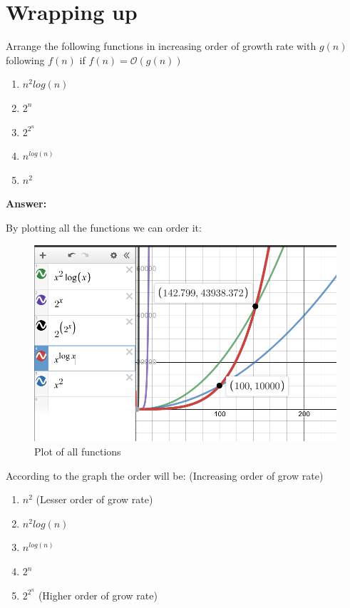 \documentclass[12pt]{article}
\begin{document}
\section{Wrapping up}

Arrange the following functions in increasing order of growth rate with $g(n)$ following $f(n)$ if $f(n) = \mathcal{O}(g(n))$

\begin{enumerate}
    \item $n^{2}log(n)$
    \item $2^{n}$
    \item $2^{2^{n}}$
    \item $n^{log(n)}$
    \item $n^{2}$
\end{enumerate}

\textbf{Answer: }

By plotting all the functions we can order it:\\

\begin{figure}[H]
    \centering
    \includegraphics[scale=0.5]{p5/p5.png}
    \caption{Plot of all functions}
    \label{p5_plot}
\end{figure}

According to the graph the order will be: (Increasing order of grow rate)\\

\begin{enumerate}
    \item $n^{2}$ (Lesser order of grow rate)
    \item $n^{2}log(n)$
    \item $n^{log(n)}$
    \item $2^{n}$
    \item $2^{2^{n}}$ (Higher order of grow rate)
\end{enumerate}
\end{document}
